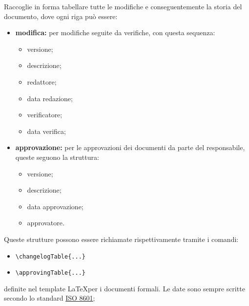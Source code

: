     Raccoglie in forma tabellare tutte le modifiche e conseguentemente la storia del documento, dove ogni riga può essere:
    \begin{itemize}
        \item \textbf{modifica: } per modifiche seguite da verifiche, con questa sequenza:
        \begin{itemize}
            \item versione;
            \item descrizione;
            \item redattore;
            \item data redazione;
            \item verificatore;
            \item data verifica;
        \end{itemize}
        \item \textbf{approvazione: }per le approvazioni dei documenti da parte del responsabile, queste seguono la struttura:
        \begin{itemize}
            \item versione;
            \item descrizione;
            \item data approvazione;
            \item approvatore.
        \end{itemize}
    \end{itemize}
    Queste strutture possono essere richiamate rispettivamente tramite i comandi:
    \begin{itemize}
        \item \texttt{\textbackslash changelogTable\{...\}}
        \item \texttt{\textbackslash approvingTable\{...\}}
    \end{itemize}
    definite nel template \LaTeX per i documenti formali.
    Le date sono sempre scritte secondo lo standard \href{https://www.iso.org/iso-8601-date-and-time-format.html}{ISO 8601};

